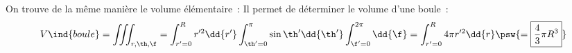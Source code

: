 \documentclass[../../main/main.tex]{subfiles}
\begin{document}
On trouve de la même manière le volume élémentaire~:
\psw{
	\[
		\boxed{\dd{V} = r^{2}\sin(\theta)\dd{r}\dd{\th}\dd{\f}}
	\]
}
Il permet de déterminer le volume d'une boule~:
\[
	V\ind{boule}
	= \iiint_{r,\th,\f}
	= \int_{r'=0}^{R} r'^2\dd{r'}
	\int_{\th' = 0}^{\pi} \sin\th'\dd{\th'}
	\int_{\f'=0}^{2\pi} \dd{\f}
	= \int_{r'=0}^{R} 4\pi r'^2 \dd{r}
	\psw{
		= \boxed{\frac{4}{3}\pi R^3}
	}
\]
\end{document}
